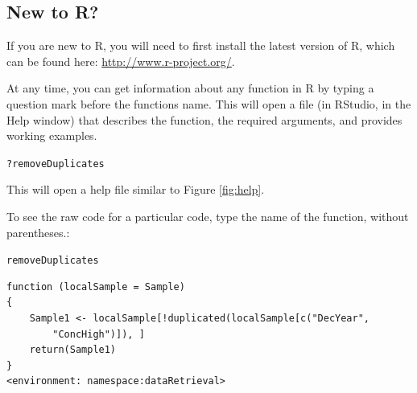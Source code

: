 \documentclass[a4paper,11pt]{article}\usepackage[]{graphicx}\usepackage[]{color}
\makeatletter
\newcommand{\hlopt}[1]{\textcolor[rgb]{0,0,0}{#1}}%
\newcommand{\hlstd}[1]{\textcolor[rgb]{0.345,0.345,0.345}{#1}}%
\newenvironment{kframe}{%
 \def\at@end@of@kframe{}%
 \ifinner\ifhmode%
  \def\at@end@of@kframe{\end{minipage}}%
  \begin{minipage}{\columnwidth}%
 \fi\fi%
 \def\FrameCommand##1{\hskip\@totalleftmargin \hskip-\fboxsep
 \colorbox{shadecolor}{##1}\hskip-\fboxsep
     \hskip-\linewidth \hskip-\@totalleftmargin \hskip\columnwidth}%
 \MakeFramed {\advance\hsize-\width
   \@totalleftmargin\z@ \linewidth\hsize
   \@setminipage}}%
 {\par\unskip\endMakeFramed%
 \at@end@of@kframe}
\newenvironment{knitrout}{}{} %
\makeatother
\begin{document}
\subsection{New to R?}
If you are new to R, you will need to first install the latest version of R, which can be found here: \url{http://www.r-project.org/}.

At any time, you can get information about any function in R by typing a question mark before the functions name.  This will open a file (in RStudio, in the Help window) that describes the function, the required arguments, and provides working examples.

\begin{knitrout}
\color{fgcolor}\begin{kframe}
\begin{alltt}
\hlopt{?}\hlstd{removeDuplicates}
\end{alltt}
\end{kframe}
\end{knitrout}

This will open a help file similar to Figure \ref{fig:help}.

\FloatBarrier

To see the raw code for a particular code, type the name of the function, without parentheses.:
\begin{knitrout}
\color{fgcolor}\begin{kframe}
\begin{alltt}
\hlstd{removeDuplicates}
\end{alltt}
\begin{verbatim}
function (localSample = Sample) 
{
    Sample1 <- localSample[!duplicated(localSample[c("DecYear", 
        "ConcHigh")]), ]
    return(Sample1)
}
<environment: namespace:dataRetrieval>
\end{verbatim}
\end{kframe}
\end{knitrout}
\end{document}
